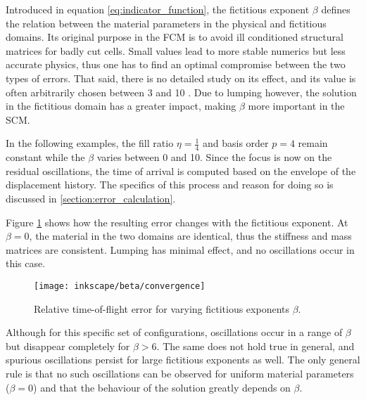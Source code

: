 Introduced in equation \ref{eq:indicator_function}, the fictitious exponent $\beta$ defines the relation between the material parameters in the physical and fictitious domains. Its original purpose in the FCM is to avoid ill conditioned structural matrices for badly cut cells. Small values lead to more stable numerics but less accurate physics, thus one has to find an optimal compromise between the two types of errors. That said, there is no detailed study on its effect, and its value is often arbitrarily chosen between 3 and 10 \cite{Parvizian2007}. Due to lumping however, the solution in the fictitious domain has a greater impact, making $\beta$ more important in the SCM.

In the following examples, the fill ratio $\eta = \frac{1}{4}$ and basis order $p=4$ remain constant while the $\beta$ varies between 0 and 10. Since the focus is now on the residual oscillations, the time of arrival is computed based on the envelope of the displacement history. The specifics of this process and reason for doing so is discussed in \ref{section:error_calculation}.

Figure \ref{fig:beta_convergence} shows how the resulting error changes with the fictitious exponent. At $\beta = 0$, the material in the two domains are identical, thus the stiffness and mass matrices are consistent. Lumping has minimal effect, and no oscillations occur in this case.

\begin{figure}[!h]
	\centering
	\texttt{[image: inkscape/beta/convergence]}
	\caption{Relative time-of-flight error for varying fictitious exponents $\beta$.}
	\label{fig:beta_convergence}
\end{figure}

Although for this specific set of configurations, oscillations occur in a range of $\beta$ but disappear completely for $\beta > 6$. The same does not hold true in general, and spurious oscillations persist for large fictitious exponents as well. The only general rule is that no such oscillations can be observed for uniform material parameters ($\beta=0$) and that the behaviour of the solution greatly depends on $\beta$.

